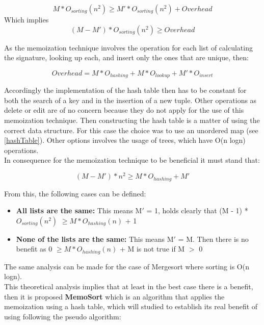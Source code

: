 \documentclass[a4paper,12pt]{article}
\begin{document}
\begin{equation}
M * O_{sorting}(n^2)  \geq M' * O_{sorting}(n^2)  + Overhead
\end{equation}
Which implies
\begin{equation}
(M - M') *  O_{sorting}(n^2)  \geq Overhead
\end{equation}

As the memoization technique involves the operation for each list of calculating the signature, looking up each, and insert only the ones that are unique, then:

\begin{equation}
Overhead =  M * O_{hashing} + M * O_{lookup} + M' * O_{insert}
\end{equation}

Accordingly the implementation of the hash table then has to be constant for both the search of a key and in the insertion of a new tuple. Other operations as delete or edit are of no concern because they do not apply for the use of this memoization technique. Then constructing the hash table is a matter of using the correct data structure. For this case the choice was to use an unordered map (see \ref{hashTable}).  Other options involves the usage of trees, which have O(n logn) operations.
\\
In consequence for the memoization technique to be beneficial it must stand that:

\begin{equation}
(M - M') *  n^2  \geq M * O_{hashing} + M'
\end{equation}

From this, the following cases can be defined:
\begin{itemize}
\item {\bf All lists are the same:}  This means M$'$ = 1, holds clearly that (M - 1) *   $O_{sorting}(n^2)$   $\geq M *O_{hashing}(n)$ + 1
\item {\bf None of the lists are the same:} This means M$'$ = M. Then there is no benefit as 0 $ \geq M * O_{hashing}(n)$ + M is not true if M $>$ 0
\end{itemize}

The same analysis can be made for the case of Mergesort where sorting is O(n logn). \\

This theoretical analysis implies that at least in the best case there is a benefit, then it is proposed  \textbf{MemoSort} which is an algorithm that applies the memoization using a hash table, which will studied to establish its real benefit of using following the pseudo algorithm: 
\end{document}
